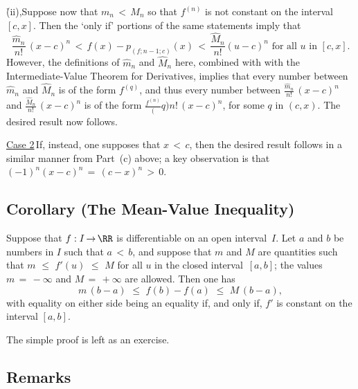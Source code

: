         \h (ii),Suppose now that $m_{n}\,<\,M_{n}$ so that $f^{(n)}$ is not constant on the interval $[c,x]$.
    Then the `only if' portions of the same statements imply that
        \begin{displaymath}
        \frac{\hat{m}_{n}}{n!}\,(x-c)^{n}\,<\,f(x)- p_{(f;n-1;c)}(x) \,<\, \frac{\hat{M}_{n}}{n!}(u-c)^{n} \mbox{ for all $u$ in $[c,x]$}.
        \end{displaymath}
    However, the definitions of $\hat{m}_{n}$ and $\hat{M}_{n}$ here, combined with with the Intermediate-Value Theorem for Derivatives,
    implies that every number between $\hat{m}_{n}$ and $\hat{M}_{n}$ is of the form $f^{(q)}$,
    and thus every number between ${\displaystyle \frac{\hat{m}_{n}}{n!}}\,(x-c)^{n}$ and ${\displaystyle \frac{\hat{M}_{n}}{n!}}\,(x-c)^{n}$
    is of the form ${\displaystyle \frac{f^{(n)}}(q){n!}}\,(x-c)^{n}$, for some $q$ in $(c,x)$. The desired result now follows.

        \underline{Case 2}\,If, instead, one supposes that $x\,<\,c$, then the desired result follows in a similar manner from Part~(c) above;
    a key observation is that $(-1)^{n}(x-c)^{n} \,=\,(c-x)^{n}\,>\,0$.

\V

            \subsection{\small{\bf Corollary} (The Mean-Value Inequality)}
            \label{CorE40.69A}

\V

        Suppose that $f:I \,{\rightarrow}\, {\RR}$ is differentiable on an open interval~$I$. 
    Let $a$ and $b$ be numbers in $I$ such that $a\,<\,b$, and suppose that $m$ and $M$ are quantities such that $m\,\,{\leq}\,\,f'(u)\,\,{\leq}\,\,M$
    for all $u$ in the closed interval~$[a,b]$; the values $m \,=\, -{\infty}$ and  $M \,=\, +{\infty}$ are allowed. Then one has
        \begin{displaymath}
        m\,(b-a)\,\,{\leq}\,\,f(b) - f(a)\,\,{\leq}\,\,M\,(b-a),
        \end{displaymath}
     with equality on either side being an equality if, and only if, $f'$ is constant on the interval $[a,b]$.

\V

        The simple proof is left as an exercise. \Q

\VV

            \subsection{\small{\bf Remarks}}
            \label{RemrkE40.69AB}

